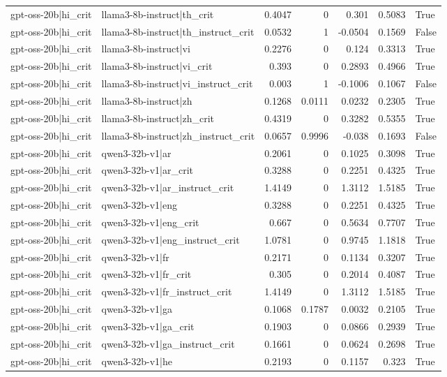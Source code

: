 \begin{table}
\begin{tabular}{l l r r r r l}
gpt-oss-20b|hi_crit & llama3-8b-instruct|th_crit & 0.4047 & 0 & 0.301 & 0.5083 & True \\
gpt-oss-20b|hi_crit & llama3-8b-instruct|th_instruct_crit & 0.0532 & 1 & -0.0504 & 0.1569 & False \\
gpt-oss-20b|hi_crit & llama3-8b-instruct|vi & 0.2276 & 0 & 0.124 & 0.3313 & True \\
gpt-oss-20b|hi_crit & llama3-8b-instruct|vi_crit & 0.393 & 0 & 0.2893 & 0.4966 & True \\
gpt-oss-20b|hi_crit & llama3-8b-instruct|vi_instruct_crit & 0.003 & 1 & -0.1006 & 0.1067 & False \\
gpt-oss-20b|hi_crit & llama3-8b-instruct|zh & 0.1268 & 0.0111 & 0.0232 & 0.2305 & True \\
gpt-oss-20b|hi_crit & llama3-8b-instruct|zh_crit & 0.4319 & 0 & 0.3282 & 0.5355 & True \\
gpt-oss-20b|hi_crit & llama3-8b-instruct|zh_instruct_crit & 0.0657 & 0.9996 & -0.038 & 0.1693 & False \\
gpt-oss-20b|hi_crit & qwen3-32b-v1|ar & 0.2061 & 0 & 0.1025 & 0.3098 & True \\
gpt-oss-20b|hi_crit & qwen3-32b-v1|ar_crit & 0.3288 & 0 & 0.2251 & 0.4325 & True \\
gpt-oss-20b|hi_crit & qwen3-32b-v1|ar_instruct_crit & 1.4149 & 0 & 1.3112 & 1.5185 & True \\
gpt-oss-20b|hi_crit & qwen3-32b-v1|eng & 0.3288 & 0 & 0.2251 & 0.4325 & True \\
gpt-oss-20b|hi_crit & qwen3-32b-v1|eng_crit & 0.667 & 0 & 0.5634 & 0.7707 & True \\
gpt-oss-20b|hi_crit & qwen3-32b-v1|eng_instruct_crit & 1.0781 & 0 & 0.9745 & 1.1818 & True \\
gpt-oss-20b|hi_crit & qwen3-32b-v1|fr & 0.2171 & 0 & 0.1134 & 0.3207 & True \\
gpt-oss-20b|hi_crit & qwen3-32b-v1|fr_crit & 0.305 & 0 & 0.2014 & 0.4087 & True \\
gpt-oss-20b|hi_crit & qwen3-32b-v1|fr_instruct_crit & 1.4149 & 0 & 1.3112 & 1.5185 & True \\
gpt-oss-20b|hi_crit & qwen3-32b-v1|ga & 0.1068 & 0.1787 & 0.0032 & 0.2105 & True \\
gpt-oss-20b|hi_crit & qwen3-32b-v1|ga_crit & 0.1903 & 0 & 0.0866 & 0.2939 & True \\
gpt-oss-20b|hi_crit & qwen3-32b-v1|ga_instruct_crit & 0.1661 & 0 & 0.0624 & 0.2698 & True \\
gpt-oss-20b|hi_crit & qwen3-32b-v1|he & 0.2193 & 0 & 0.1157 & 0.323 & True \\

\end{tabular}
\end{table}
